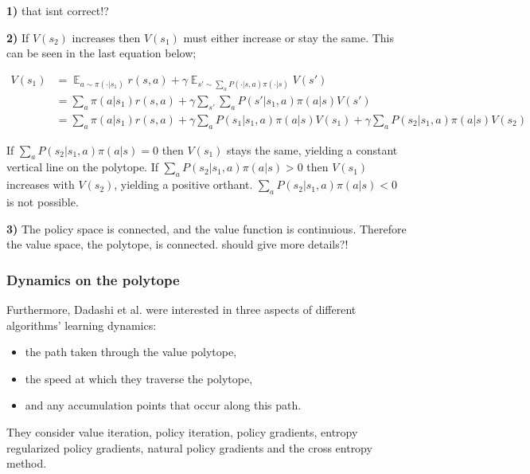 \textbf{1)} {\color{red} that isnt correct!?}

\textbf{2)} If $V(s_2)$ increases then $V(s_1)$ must either increase or stay the same.
This can be seen in the last equation below;

\begin{align*}
V(s_1) &= \mathop{\mathbb E}_{a \sim\pi(\cdot|s_1)} r(s, a) + \gamma \mathop{\mathbb E}_{s'\sim \sum_a P(\cdot|s, a)\pi(\cdot|s)} V(s')\\
&= \sum_a \pi(a|s_1)r(s, a) + \gamma \sum_{s'}\sum_a P(s'|s_1, a)\pi(a|s) V(s') \\
&= \sum_a \pi(a|s_1)r(s, a) + \gamma \sum_a P(s_1|s_1, a)\pi(a|s) V(s_1) + \gamma\sum_a P(s_2|s_1, a)\pi(a|s) V(s_2)
\end{align*}

If $\sum_a P(s_2|s_1, a)\pi(a|s) = 0$ then $V(s_1)$ stays the same, yielding a constant vertical line on the polytope.
If $\sum_a P(s_2|s_1, a)\pi(a|s) > 0$ then $V(s_1)$ increases with $V(s_2)$, yielding a positive orthant.
$\sum_a P(s_2|s_1, a)\pi(a|s) < 0$ is not possible.

\textbf{3)} The policy space is connected, and the value function is continuious.
Therefore the value space, the polytope, is connected. {\color{red}should give more details?!}


\subsubsection{Dynamics on the polytope}

Furthermore, Dadashi et al. \cite{Dadashi2018} were interested in three aspects of different algorithms’ learning dynamics:

\begin{itemize}
\tightlist
  \item the path taken through the value polytope,
  \item the speed at which they traverse the polytope,
  \item and any accumulation points that occur along this path.
\end{itemize}


They consider value iteration, policy iteration, policy gradients, entropy regularized policy gradients,
natural policy gradients and the cross entropy method.

